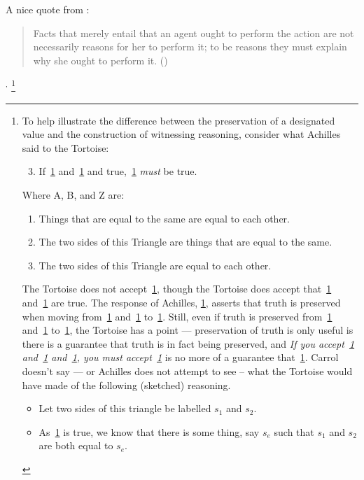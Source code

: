 \documentclass[10pt]{article}
\begin{document}
\begin{note}
{    A nice quote from \textcite{Broome:2013aa}:
    \begin{quote}
      Facts that merely entail that an agent ought to perform the action are not necessarily reasons for her to perform it; to be reasons they must explain why she ought to perform it.\nolinebreak
      \mbox{}\hfill\mbox{(\citeyear[51]{Broome:2013aa})}
    \end{quote}
  }\(^{,}\)
  \footnote{
  To help illustrate the difference between the preservation of a designated value and the construction of witnessing reasoning, consider what Achilles said to the Tortoise:
  \begin{enumerate}[label=(\emph{\Alph*}), ref=\emph{\Alph*}]
     \setcounter{enumi}{2}
    \item\label{achilles:C} If~\ref{achilles:A} and~\ref{achilles:B} and true,~\ref{achilles:C} \emph{must} be true.
  \end{enumerate}
  Where A, B, and Z are:
  \begin{enumerate}[label=(\emph{\Alph*}), ref=\emph{\Alph*}]
  \item\label{achilles:A} Things that are equal to the same are equal to each other.
  \item\label{achilles:B} The two sides of this Triangle are things that are equal to the same.
    \setcounter{enumi}{25}
  \item\label{achilles:Z} The two sides of this Triangle are equal to each other.
  \end{enumerate}
  The Tortoise does not accept~\ref{achilles:C}, though the Tortoise does accept that~\ref{achilles:A} and~\ref{achilles:B} are true.
  The response of Achilles, \ref{achilles:C}, asserts that truth is preserved when moving from~\ref{achilles:A} and~\ref{achilles:B} to~\ref{achilles:Z}.
  Still, even if truth is preserved from~\ref{achilles:A} and~\ref{achilles:B} to~\ref{achilles:Z}, the Tortoise has a point --- preservation of truth is only useful is there is a guarantee that truth is in fact being preserved, and \emph{If you accept~\ref{achilles:A} and~\ref{achilles:B} and~\ref{achilles:C}, you must accept~\ref{achilles:Z}} is no more of a guarantee that~\ref{achilles:Z}.
  Carrol doesn't say --- or Achilles does not attempt to see -- what the Tortoise would have made of the following (sketched) reasoning.
  \begin{itemize}
  \item Let two sides of this triangle be labelled \(s_{1}\) and \(s_{2}\).
  \item As~\ref{achilles:B} is true, we know that there is some thing, say \(s_{e}\) such that \(s_{1}\) and \(s_{2}\) are both equal to \(s_{e}\).

\end{itemize}}
\end{note}
\end{document}
